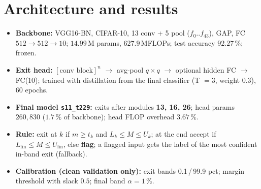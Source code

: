\documentclass[10pt,a4paper]{article}
\newcommand{\meth}[1]{\texttt{#1}}
\begin{document}
\section{Architecture and results}

\begin{itemize}
  \item \textbf{Backbone:} VGG16-BN, CIFAR-10, 13 conv + 5 pool ($f_0..f_{43}$), GAP, FC $512\!\to\!512\!\to\!10$;
        $14.99$\,M params, $627.9$\,MFLOPs; test accuracy $92.27\,\%$; frozen.
  \item \textbf{Exit head:} $[\text{conv block}]^n$ $\to$ avg-pool $q\times q$ $\to$ optional hidden FC $\to$ FC(10);
        trained with distillation from the final classifier (T $=3$, weight $0.3$), 60 epochs.
  \item \textbf{Final model \meth{s11\_t229}:} exits after modules \textbf{13, 16, 26}; head params $260{,}830$
        ($1.7\,\%$ of backbone); head FLOP overhead $3.67\,\%$.
  \item \textbf{Rule:} exit at $k$ if $m\ge t_k$ and $L_k\le M\le U_k$; at the end accept if
        $L_{\text{fin}}\le M\le U_{\text{fin}}$, else \textbf{flag}; a flagged input gets the label of the most
        confident in-band exit (fallback).
  \item \textbf{Calibration (clean validation only):} exit bands 0.1\,/\,99.9 pct; margin threshold with slack
        $0.5$; final band $\alpha=1\,\%$.
\end{itemize}
\end{document}
